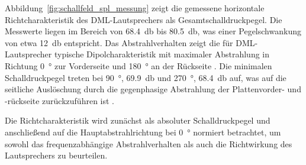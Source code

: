 Abbildung~\ref{fig:schallfeld_spl_messung} zeigt die gemessene horizontale Richtcharakteristik des DML-Lautsprechers als Gesamtschalldruckpegel. Die Messwerte liegen im Bereich von \SI{68,4}{\decibel} bis \SI{80,5}{\decibel}, was einer Pegelschwankung von etwa \SI{12}{\decibel} entspricht. Das Abstrahlverhalten zeigt die für DML-Lautsprecher typische Dipolcharakteristik mit maximaler Abstrahlung in Richtung \SI{0}{\degree} zur Vorderseite und \SI{180}{\degree} an der Rückseite \cite{Harris2000,Bai2001}. Die minimalen Schalldruckpegel treten bei \SI{90}{\degree}, \SI{69,9}{\decibel} und \SI{270}{\degree}, \SI{68,4}{\decibel} auf, was auf die seitliche Auslöschung durch die gegenphasige Abstrahlung der Plattenvorder- und -rückseite zurückzuführen ist \cite{Harris2000}.



Die Richtcharakteristik wird zunächst als absoluter Schalldruckpegel und anschließend auf die Hauptabstrahlrichtung bei \SI{0}{\degree} normiert betrachtet, um sowohl das frequenzabhängige Abstrahlverhalten als auch die Richtwirkung des Lautsprechers zu beurteilen.


